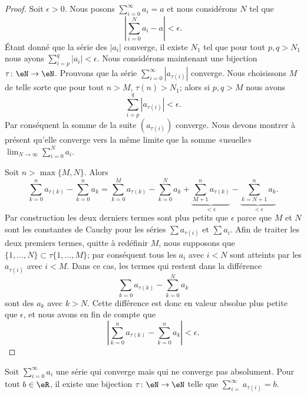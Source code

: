 \begin{proof}
    Soit \( \epsilon>0\). Nous posons \( \sum_{i=0}^\infty a_i=a\) et nous considérons \( N\) tel que
    \begin{equation}
        | \sum_{i=0}^Na_i-a |<\epsilon.
    \end{equation}
    Étant donné que la série des \( | a_i |\) converge, il existe \( N_1\) tel que pour tout \( p,q>N_1\) nous ayons \( \sum_{i=p}^q| a_i |<\epsilon\). Nous considérons maintenant une bijection \( \tau\colon \eN\to \eN \). Prouvons que la série \( \sum_{i=0}^{\infty}| a_{\tau(i)} |\) converge. Nous choisissons \( M\) de telle sorte que pour tout \( n>M\), \( \tau(n)>N_1\); alors si \( p,q>M\) nous avons
    \begin{equation}
        \sum_{i=p}^q| a_{\tau(i)} |<\epsilon.
    \end{equation}
    Par conséquent la somme de la suite \( (a_{\tau(i)})\) converge. Nous devons montrer à présent qu'elle converge vers la même limite que la somme «usuelle» \( \lim_{N\to \infty} \sum_{i=0}^Na_i\).

    Soit \( n>\max\{ M,N \}\). Alors
    \begin{equation}
        \sum_{k=0}^na_{\tau(k)}-\sum_{k=0}^na_k=\sum_{k=0}^Ma_{\tau(k)}-\sum_{k=0}^Na_k+\underbrace{\sum_{M+1}^na_{\tau(k)}}_{<\epsilon}-\underbrace{\sum_{k=N+1}^na_k}_{<\epsilon}.
    \end{equation}
    Par construction les deux derniers termes sont plus petits que \( \epsilon\) parce que \( M\) et \( N\) sont les constantes de Cauchy pour les séries \( \sum a_{\tau(i)}\) et \( \sum a_i\). Afin de traiter les deux premiers termes, quitte à redéfinir \( M\), nous supposons que \( \{ 1,\ldots, N \}\subset \tau\{ 1,\ldots, M \}\); par conséquent tous les \( a_i\) avec \( i<N\) sont atteints par les \( a_{\tau(i)}\) avec \( i<M\). Dans ce cas, les termes qui restent dans la différence
    \begin{equation}
        \sum_{k=0}a_{\tau(k)}-\sum_{k=0}^Na_k
    \end{equation}
    sont des \( a_k\) avec \( k>N\). Cette différence est donc en valeur absolue plus petite que \( \epsilon\), et nous avons en fin de compte que
    \begin{equation}
        \left| \sum_{k=0}^na_{\tau(k)}-\sum_{k=0}^na_k \right| <\epsilon.
    \end{equation}
\end{proof}

\begin{proposition}     \label{PropyFJXpr}
    Soit \( \sum_{i=0}^{\infty}a_i\) une série qui converge mais qui ne converge pas absolument. Pour tout \( b\in \eR\), il existe une bijection \( \tau\colon \eN\to \eN\) telle que \( \sum_{i=}^{\infty}a_{\tau(i)}=b\).
\end{proposition}

